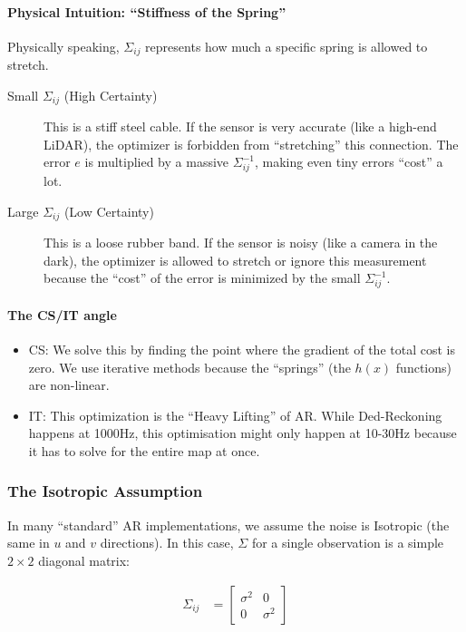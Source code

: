 \documentclass[11pt]{article}
\begin{document}
\paragraph*{Physical Intuition: ``Stiffness of the Spring''}
\label{sec:org5b6b785}

Physically speaking, \(\Sigma_{ij}\) represents how much
a specific spring is allowed to stretch.

\begin{description}
\item[{Small \(\Sigma_{ij}\) (High Certainty)}] This is a
stiff steel cable.  If the sensor is very accurate
(like a high-end LiDAR), the optimizer is forbidden
from ``stretching'' this connection.  The error \(e\) is
multiplied by a massive \(\Sigma_{ij}^{-1}\), making
even tiny errors ``cost'' a lot.
\item[{Large \(\Sigma_{ij}\) (Low Certainty)}] This is a
loose rubber band.  If the sensor is noisy (like a
camera in the dark), the optimizer is allowed to
stretch or ignore this measurement because the ``cost''
of the error is minimized by the small
\(\Sigma_{ij}^{-1}\).
\end{description}
\paragraph*{The CS/IT angle}
\label{sec:org6e576cc}

\begin{itemize}
\item CS:
\label{sec:org0e6e563}
We solve this by finding the point where the gradient
of the total cost is zero. We use iterative methods
because the ``springs'' (the \(h(x)\) functions) are
non-linear.
\item IT:
\label{sec:orgcf9b65b}
This optimization is the ``Heavy Lifting'' of AR.  While
Ded-Reckoning happens at 1000Hz, this optimisation
might only happen at 10-30Hz because it has to solve
for the entire map at once.
\end{itemize}
\subsubsection{The Isotropic Assumption}
\label{sec:orgf7758d2}

In many ``standard'' AR implementations, we assume the
noise is Isotropic (the same in \(u\) and \(v\)
directions).  In this case, \(\Sigma\) for a single
observation is a simple \(2 \times 2\) diagonal matrix:

\begin{align*}
  \Sigma_{ij}
  &= \begin{bmatrix}
    \sigma^2 & 0 \\ 0 & \sigma^2
  \end{bmatrix}
\end{align*}
\end{document}
